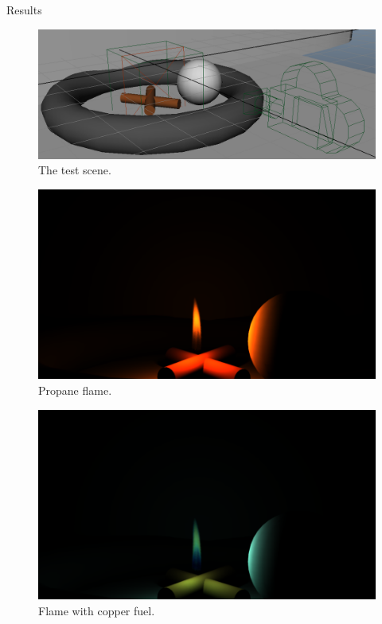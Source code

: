 \documentclass{beamer}
\begin{document}
\begin{frame}[allowframebreaks]{Results}

\begin{figure}[p]
\begin{center}
\includegraphics[width=\textwidth]{img/test_scene_view}
\caption*{\tiny{The test scene.}}
\end{center}
\end{figure}

\begin{figure}[p]
\begin{center}
\includegraphics[width=\textwidth, trim={8cm 0 8cm 10cm}, clip]{img/result_propane_shadows}
\caption*{\tiny{Propane flame.}}
\end{center}
\end{figure}

\begin{figure}[p]
\begin{center}
\includegraphics[width=\textwidth, trim={8cm 0 8cm 10cm}, clip]{img/result_copper}
\caption*{\tiny{Flame with copper fuel.}}
\end{center}
\end{figure}


\end{frame}
\end{document}
